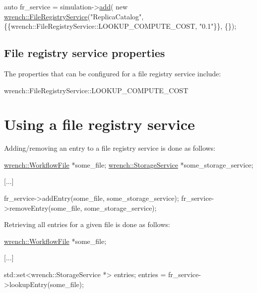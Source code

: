 \begin{DoxyCode}
\textcolor{keyword}{auto} fr\_service = simulation->\hyperlink{classwrench_1_1_simulation_ad1f5c12285ecfaf5a2ce7dab5ec8b4c5}{add}(
          \textcolor{keyword}{new} \hyperlink{classwrench_1_1_file_registry_service}{wrench::FileRegistryService}(\textcolor{stringliteral}{"ReplicaCatalog"},
                                       \{\{wrench::FileRegistryService::LOOKUP\_COMPUTE\_COST, \textcolor{stringliteral}{"0.1"}\}\},
                                       \{\});
\end{DoxyCode}
\hypertarget{guide-fileregistry_guide-fileregistry-creating-properties}{}\subsection{File registry service properties}\label{guide-fileregistry_guide-fileregistry-creating-properties}
The properties that can be configured for a file registry service include\+:


\begin{DoxyItemize}
\item {\ttfamily wrench\+::\+File\+Registry\+Service\+::\+L\+O\+O\+K\+U\+P\+\_\+\+C\+O\+M\+P\+U\+T\+E\+\_\+\+C\+O\+ST}
\end{DoxyItemize}\hypertarget{guide-fileregistry_guide-fileregistry-using}{}\section{Using a file registry service}\label{guide-fileregistry_guide-fileregistry-using}
Adding/removing an entry to a file registry service is done as follows\+:


\begin{DoxyCode}
\hyperlink{classwrench_1_1_workflow_file}{wrench::WorkflowFile} *some\_file;
\hyperlink{classwrench_1_1_storage_service}{wrench::StorageService} *some\_storage\_service;

[...]

fr\_service->addEntry(some\_file, some\_storage\_service);
fr\_service->removeEntry(some\_file, some\_storage\_service);
\end{DoxyCode}


Retrieving all entries for a given file is done as follows\+:


\begin{DoxyCode}
\hyperlink{classwrench_1_1_workflow_file}{wrench::WorkflowFile} *some\_file;

[...]

std::set<wrench::StorageService *> entries;
entries = fr\_service->lookupEntry(some\_file);
\end{DoxyCode}


